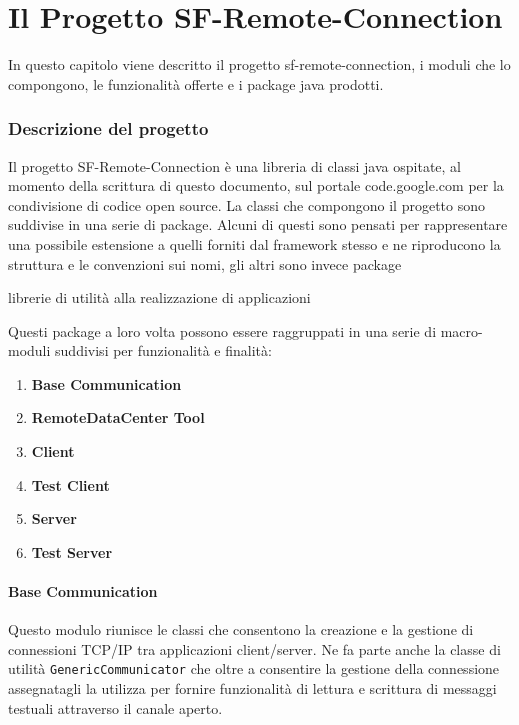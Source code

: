 
\chapter{Il Progetto SF-Remote-Connection}
\label{ch:sfremoteconnection}
In questo capitolo viene descritto il progetto sf-remote-connection, i moduli che lo compongono, le funzionalità offerte e i package java prodotti.

\subsection{Descrizione del progetto} 
\label{sub:descrizione}
Il progetto SF-Remote-Connection è una libreria di classi java ospitate, al momento della scrittura di questo documento, sul portale %
code.google.com per la condivisione di codice open source.
La classi che compongono il progetto sono suddivise in una serie di package. %
Alcuni di questi sono pensati per rappresentare una possibile estensione a quelli forniti dal framework stesso e ne riproducono la struttura e le convenzioni sui nomi, gli altri sono invece package

librerie di utilità alla realizzazione di applicazioni 

Questi package a loro volta possono essere raggruppati in una serie di macro-moduli suddivisi per funzionalità e finalità:
\begin{enumerate}
	\item \textbf{Base Communication}
	\item \textbf{RemoteDataCenter Tool}
	\item \textbf{Client}
	\item \textbf{Test Client}
	\item \textbf{Server}         
	\item \textbf{Test Server}
\end{enumerate}

\subsubsection{Base Communication}
Questo modulo riunisce le classi che consentono la creazione e la gestione di connessioni TCP/IP tra applicazioni client/server. Ne fa parte anche la classe di utilità \texttt{GenericCommunicator} che oltre a consentire la gestione della connessione assegnatagli la utilizza per fornire funzionalità di lettura e scrittura di messaggi testuali attraverso il canale aperto.

